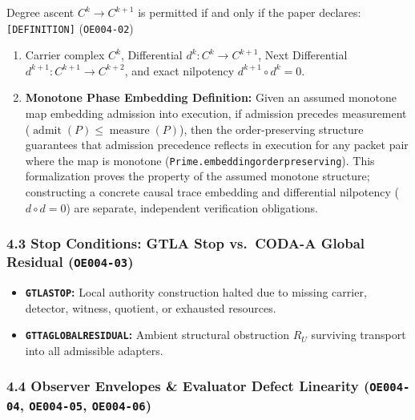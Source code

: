 \documentclass[
  11pt,
]{article}
\providecommand{\tightlist}{%
  \setlength{\itemsep}{0pt}\setlength{\parskip}{0pt}}
\renewcommand{\_}{\origunderscore\allowbreak}
\begin{document}
Degree ascent \(C^k \longrightarrow C^{k+1}\) is permitted if and only
if the paper declares: \texttt{{[}DEFINITION{]}} (\texttt{OE004-02})

\begin{enumerate}
\def\labelenumi{\arabic{enumi}.}
\tightlist
\item
  Carrier complex \(C^k\), Differential \(d^k: C^k \to C^{k+1}\), Next
  Differential \(d^{k+1}: C^{k+1} \to C^{k+2}\), and exact nilpotency
  \(d^{k+1} \circ d^k = 0\).
\item
  \textbf{Monotone Phase Embedding Definition:} Given an assumed
  monotone map embedding admission into execution, if admission precedes
  measurement
  (\(\operatorname{admit}(P) \le \operatorname{measure}(P)\)), then the
  order-preserving structure guarantees that admission precedence
  reflects in execution for any packet pair where the map is monotone
  (\texttt{Prime.embedding\_order\_preserving}). This formalization
  proves the property of the assumed monotone structure; constructing a
  concrete causal trace embedding and differential nilpotency
  (\(d \circ d = 0\)) are separate, independent verification
  obligations.
\end{enumerate}

\subsubsection{\texorpdfstring{4.3 Stop Conditions: GTLA Stop vs.~CODA-A
Global Residual
(\texttt{OE004-03})}{4.3 Stop Conditions: GTLA Stop vs.~CODA-A Global Residual (OE004-03)}}\label{stop-conditions-gtla-stop-vs.-coda-a-global-residual-oe004-03}

\begin{itemize}
\tightlist
\item
  \textbf{\texttt{GTLA\_STOP}:} Local authority construction halted due
  to missing carrier, detector, witness, quotient, or exhausted
  resources.
\item
  \textbf{\texttt{GTTA\_GLOBAL\_RESIDUAL}:} Ambient structural
  obstruction \(R_U\) surviving transport into all admissible adapters.
\end{itemize}

\subsubsection{\texorpdfstring{4.4 Observer Envelopes \& Evaluator
Defect Linearity (\texttt{OE004-04}, \texttt{OE004-05},
\texttt{OE004-06})}{4.4 Observer Envelopes \& Evaluator Defect Linearity (OE004-04, OE004-05, OE004-06)}}\label{observer-envelopes-evaluator-defect-linearity-oe004-04-oe004-05-oe004-06}
\end{document}
